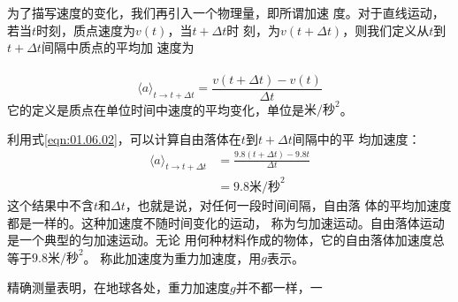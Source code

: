 \documentclass[../outline-of-mechanics.tex]{subfiles}
\begin{document}
\section[加速度]{}\label{sec:01.08}

为了描写速度的变化，我们再引入一个物理量，即所谓加速
度。对于直线运动，若当$t$时刻，质点速度为$v\left(t\right)$，当$t+\Delta t$时
刻，为$v\left(t+\Delta t\right)$，则我们定义从$t$到$t+\Delta t$间隔中质点的平均加
速度为\\~\vspace{-2em}
\begin{equation}\label{eqn:01.08.01}
  \langle a\rangle_{t\rightarrow t+\Delta t} = \frac{v\left(t+\Delta t\right)-v\left(t\right)}{\Delta t}
\end{equation}
它的定义是质点在单位时间中速度的平均变化，单位是$\text{米/秒}^2$。

利用式\eqref{eqn:01.06.02}，可以计算自由落体在$t$到$t+\Delta t$间隔中的平
均加速度：\vspace{-1em}
\begin{equation*}
  \begin{aligned}
    \langle a\rangle_{t\rightarrow t+\Delta t} & = \frac{9.8\left(t+\Delta t\right)-9.8t}{\Delta t} \\
                                               & = 9.8\text{米/秒}^2
  \end{aligned}
\end{equation*}
这个结果中不含$t$和$\Delta t$，也就是说，对任何一段时间间隔，自由落
体的平均加速度都是一样的。这种加速度不随时间变化的运动，
称为匀加速运动。自由落体运动是一个典型的匀加速运动。无论
用何种材料作成的物体，它的自由落体加速度总等于$9.8\text{米/秒}^2$。
称此加速度为重力加速度，用$g$表示。

精确测量表明，在地球各处，重力加速度$g$并不都一样，一

\mbox{}
\end{document}
